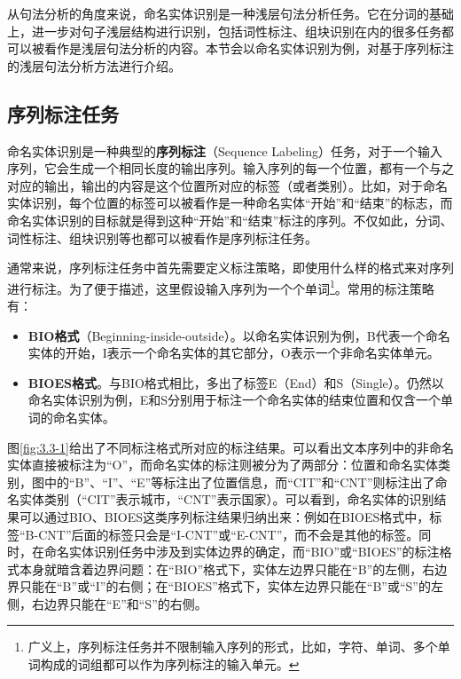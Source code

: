\parinterval 从句法分析的角度来说，命名实体识别是一种浅层句法分析任务。它在分词的基础上，进一步对句子浅层结构进行识别，包括词性标注、组块识别在内的很多任务都可以被看作是浅层句法分析的内容。本节会以命名实体识别为例，对基于序列标注的浅层句法分析方法进行介绍。


\subsection{序列标注任务}

\parinterval 命名实体识别是一种典型的{\small\sffamily\bfseries{序列标注}}（Sequence Labeling）任务，对于一个输入序列，它会生成一个相同长度的输出序列。输入序列的每一个位置，都有一个与之对应的输出，输出的内容是这个位置所对应的标签（或者类别）。比如，对于命名实体识别，每个位置的标签可以被看作是一种命名实体“开始”和“结束”的标志，而命名实体识别的目标就是得到这种“开始”和“结束”标注的序列。不仅如此，分词、词性标注、组块识别等也都可以被看作是序列标注任务。

\parinterval 通常来说，序列标注任务中首先需要定义标注策略，即使用什么样的格式来对序列进行标注。为了便于描述，这里假设输入序列为一个个单词\footnote{广义上，序列标注任务并不限制输入序列的形式，比如，字符、单词、多个单词构成的词组都可以作为序列标注的输入单元。}。常用的标注策略有：

\begin{itemize}
\vspace{0.5em}
\item {\small\sffamily\bfseries{BIO格式}}（Beginning-inside-outside）。以命名实体识别为例，B代表一个命名实体的开始，I表示一个命名实体的其它部分，O表示一个非命名实体单元。
\vspace{0.5em}
\item {\small\sffamily\bfseries{BIOES格式}}。与BIO格式相比，多出了标签E（End）和S（Single）。仍然以命名实体识别为例，E和S分别用于标注一个命名实体的结束位置和仅含一个单词的命名实体。
\vspace{0.5em}
\end{itemize}

\parinterval 图\ref{fig:3.3-1}给出了不同标注格式所对应的标注结果。可以看出文本序列中的非命名实体直接被标注为“O”，而命名实体的标注则被分为了两部分：位置和命名实体类别，图中的“B”、“I”、“E”等标注出了位置信息，而“CIT”和“CNT”则标注出了命名实体类别（“CIT”表示城市，“CNT”表示国家）。可以看到，命名实体的识别结果可以通过BIO、BIOES这类序列标注结果归纳出来：例如在BIOES格式中，标签“B-CNT”后面的标签只会是“I-CNT”或“E-CNT”，而不会是其他的标签。同时，在命名实体识别任务中涉及到实体边界的确定，而“BIO”或“BIOES”的标注格式本身就暗含着边界问题：在“BIO”格式下，实体左边界只能在“B”的左侧，右边界只能在“B”或“I”的右侧；在“BIOES”格式下，实体左边界只能在“B”或“S”的左侧，右边界只能在“E”和“S”的右侧。

